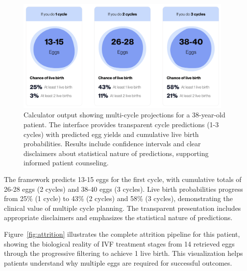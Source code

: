 \begin{figure}[H]
    \centering
    \includegraphics[width=0.95\textwidth]{figures/OocytePrediction.png}
    \caption{Calculator output showing multi-cycle projections for a 38-year-old patient. The interface provides transparent cycle predictions (1-3 cycles) with predicted egg yields and cumulative live birth probabilities. Results include confidence intervals and clear disclaimers about statistical nature of predictions, supporting informed patient counseling.}
    \label{fig:oocyte_prediction}
\end{figure}

The framework predicts 13-15 eggs for the first cycle, with cumulative totals of 26-28 eggs (2 cycles) and 38-40 eggs (3 cycles). Live birth probabilities progress from 25\% (1 cycle) to 43\% (2 cycles) and 58\% (3 cycles), demonstrating the clinical value of multiple cycle planning. The transparent presentation includes appropriate disclaimers and emphasizes the statistical nature of predictions.

Figure~\ref{fig:attrition} illustrates the complete attrition pipeline for this patient, showing the biological reality of IVF treatment stages from 14 retrieved eggs through the progressive filtering to achieve 1 live birth. This visualization helps patients understand why multiple eggs are required for successful outcomes.

